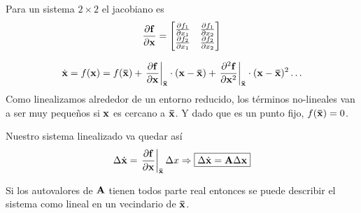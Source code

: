 \documentclass[11pt, a4paper, twoside, openright, openany]{book}
\begin{document}
Para un sistema \(2\times 2\) el jacobiano es
\[
\frac{\partial {\mathbf{f}}}{\partial {\mathbf{x}}}=
\begin{bmatrix}
\frac{\partial {f_1}}{\partial {x_1}} &\frac{\partial {f_1}}{\partial {x_2}} \\
\frac{\partial {f_2}}{\partial {x_1}} & \frac{\partial {f_2}}{\partial {x_2}}
\end{bmatrix}
\]


\[
\dot{\mathbf{x}} = f(\mathbf{x}) = f(\mathbf{\bar{x}}) + \left. \frac{\partial {\mathbf{f}}}{\partial {\mathbf{x}}}\right|_{\mathbf{\bar{x}}}\cdot (\mathbf{x}-\mathbf{\bar{x}}) + \left.\frac{\partial^2 \mathbf{f}}{\partial \mathbf{x} ^2} \right|_{\mathbf{\bar{x}}}\cdot (\mathbf{x}-\mathbf{\bar{x}})^2 \ldots
\]
Como linealizamos alrededor de un entorno reducido, los términos no-lineales van a ser muy pequeños si $\mathbf{x}$ es cercano a $\mathbf{\bar{x}}$. Y dado que es un punto fijo, $f(\mathbf{\bar{x}})=0$.

Nuestro sistema linealizado va quedar así
\[
\Delta \dot{\mathbf{x}} = \left.\frac{\partial {\mathbf{f}}}{\partial {\mathbf{x}}}\right|_{\mathbf{\bar{x}}} \Delta x \Rightarrow \boxed{\Delta \dot{\mathbf{x}} = \mathbf{A} \Delta \mathbf{x} }
\]

\begin{theorem}
Si los autovalores de $\mathbf{A}$ tienen todos parte real entonces se puede describir el sistema como lineal en un vecindario de $\mathbf{\bar{x}}$.
\end{theorem}
\end{document}

